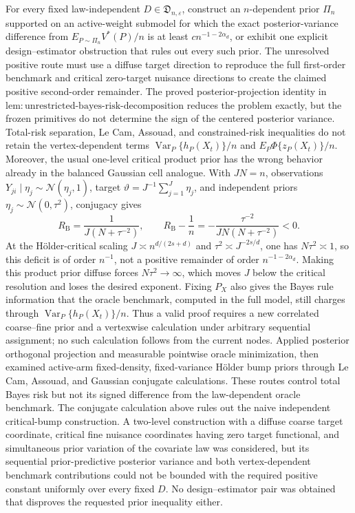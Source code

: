 For every fixed law-independent \(D\in\mathfrak D_{n,\varepsilon}\), construct an \(n\)-dependent prior \(\Pi_n\) supported on an active-weight submodel for which the exact posterior-variance difference from \(E_{P\sim\Pi_n}V^*(P)/n\) is at least \(c n^{-1-2\alpha_d}\), or exhibit one explicit design--estimator obstruction that rules out every such prior.  The unresolved positive route must use a diffuse target direction to reproduce the full first-order benchmark and critical zero-target nuisance directions to create the claimed positive second-order remainder.
The proved posterior-projection identity in \(\mathrm{lem{:}unrestricted\text{-}bayes\text{-}risk\text{-}decomposition}\) reduces the problem exactly, but the frozen primitives do not determine the sign of the centered posterior variance.  Total-risk separation, Le Cam, Assouad, and constrained-risk inequalities do not retain the vertex-dependent terms \(\operatorname{Var}_P\{h_P(X_t)\}/n\) and \(E_P\Phi\{z_P(X_t)\}/n\).  Moreover, the usual one-level critical product prior has the wrong behavior already in the balanced Gaussian cell analogue.  With \(J N=n\), observations \(Y_{ji}\mid\eta_j\sim\mathcal N(\eta_j,1)\), target \(\vartheta=J^{-1}\sum_{j=1}^J\eta_j\), and independent priors \(\eta_j\sim\mathcal N(0,\tau^2)\), conjugacy gives
\[
R_{\mathrm B}=\frac{1}{J(N+\tau^{-2})},
\qquad
R_{\mathrm B}-\frac1n
=-\frac{\tau^{-2}}{JN(N+\tau^{-2})}<0.
\]
At the Hölder-critical scaling \(J\asymp n^{d/(2s+d)}\) and \(\tau^2\asymp J^{-2s/d}\), one has \(N\tau^2\asymp1\), so this deficit is of order \(n^{-1}\), not a positive remainder of order \(n^{-1-2\alpha_d}\).  Making this product prior diffuse forces \(N\tau^2\to\infty\), which moves \(J\) below the critical resolution and loses the desired exponent.  Fixing \(P_X\) also gives the Bayes rule information that the oracle benchmark, computed in the full model, still charges through \(\operatorname{Var}_P\{h_P(X_t)\}/n\).  Thus a valid proof requires a new correlated coarse--fine prior and a vertexwise calculation under arbitrary sequential assignment; no such calculation follows from the current nodes.
Applied posterior orthogonal projection and measurable pointwise oracle minimization, then examined active-arm fixed-density, fixed-variance Hölder bump priors through Le Cam, Assouad, and Gaussian conjugate calculations.  These routes control total Bayes risk but not its signed difference from the law-dependent oracle benchmark.  The conjugate calculation above rules out the naive independent critical-bump construction.  A two-level construction with a diffuse coarse target coordinate, critical fine nuisance coordinates having zero target functional, and simultaneous prior variation of the covariate law was considered, but its sequential prior-predictive posterior variance and both vertex-dependent benchmark contributions could not be bounded with the required positive constant uniformly over every fixed \(D\).  No design--estimator pair was obtained that disproves the requested prior inequality either.
